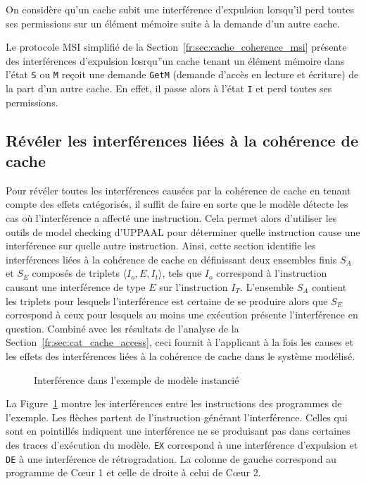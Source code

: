 \begin{definition}
On considère qu'un cache subit une interférence d'expulsion lorsqu'il perd
toutes ses permissions sur un élément mémoire suite à la demande d'un autre
cache.
\end{definition}

\begin{example}
Le protocole MSI simplifié de la Section~\ref{fr:sec:cache_coherence_msi}
présente des interférences d'expulsion losrqu''un cache tenant un élément mémoire
dans l'état \texttt{S} ou \texttt{M} reçoit une demande \texttt{GetM} (demande
d'accès en lecture et écriture) de la part d'un autre cache. En effet, il passe
alors à l'état \texttt{I} et perd toutes ses permissions.
\end{example}

\subsection{Révéler les interférences liées à la cohérence de cache}
\label{fr:sec:analysis:missing_link}
Pour révéler toutes les interférences causées par la cohérence de
cache en tenant compte des effets catégorisés, il suffit de
faire en sorte que le modèle détecte les cas où l'interférence a
affecté une instruction. Cela permet alors d'utiliser les outils de
model checking d'UPPAAL pour déterminer quelle instruction cause
une interférence sur quelle autre instruction.
Ainsi, cette section identifie les interférences liées à la cohérence de cache en
définissant deux ensembles finis $S_A$ et $S_E$ composés de triplets
$\langle I_o, E, I_t \rangle$, tels que $I_o$ correspond à l'instruction
causant une interférence de type $E$ sur l'instruction $I_T$. L'ensemble
$S_A$ contient les triplets pour lesquels l'interférence est certaine de se
produire alors que $S_E$ correspond à ceux pour lesquels au moins une exécution
présente l'interférence en question.
Combiné avec les résultats de l'analyse de la
Section~\ref{fr:sec:cat_cache_access}, ceci fournit à l'applicant à la fois les
causes et les effets des interférences liées à la cohérence de cache dans le
système modélisé.

\begin{figure}[hbt]
\centering

\caption{Interférence dans l'exemple de modèle instancié}
\label{fr:fig:analysis:interference_between_instructions}
\end{figure}

\begin{example}
  La Figure~\ref{fr:fig:analysis:interference_between_instructions}
  montre les interférences entre les instructions des programmes de
  l'exemple. Les flèches partent de l'instruction générant
  l'interférence. Celles qui sont en pointillés indiquent une
  interférence ne se produisant pas dans certaines des traces
  d'exécution du modèle.  \lstinline!EX! correspond à une interférence
  d'expulsion et \lstinline!DE!  à une interférence de rétrogradation.
  La colonne de gauche correspond au programme de Cœur 1 et celle de
  droite à celui de Cœur 2.  
\end{example}
